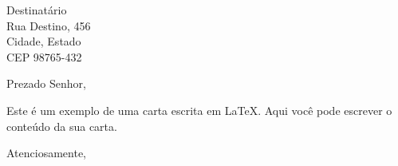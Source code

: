 \documentclass{letter}
\begin{document}
	
	\begin{letter}{Destinatário \\ Rua Destino, 456 \\ Cidade, Estado \\ CEP 98765-432}
		
		\opening{Prezado Senhor,}
		
		Este é um exemplo de uma carta escrita em LaTeX. Aqui você pode escrever o conteúdo da sua carta.
		
		\closing{Atenciosamente,}
		
	\end{letter}
	
\end{document}
